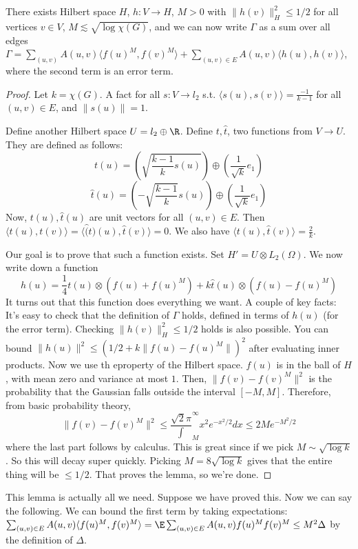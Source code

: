 \begin{lem} There exists Hilbert space $H$, $h: V \to H$, $M > 0$ with $\|h(v)\|_H^2 \leq 1/2$ for all vertices $v \in V$, $M \lesssim \sqrt{\log \chi(G)}$, and we can now write $\Gamma$ as a sum over all edges $\Gamma = \sum_{(u, v)} A(u, v) \langle f(u)^M, f(v)^M \rangle + \sum_{(u, v) \in E} A(u, v) \langle h(u), h(v) \rangle$, where the second term is an error term. 
\end{lem}
\begin{proof}
Let $k = \chi(G)$. A fact for all $s: V \to l_2$ s.t. $\langle s(u), s(v) \rangle = \frac{-1}{k - 1}$ for all $(u, v) \in E$, and $\|s(u)\| = 1$. 

Define another Hilbert space $U = l_2 \oplus \R$. Define $t, \hat{t}$, two functions from $V \to U$. They are defined as follows: 
\[
t(u) = (\sqrt{\frac{k - 1}{k} s(u)}) \oplus (\frac{1}{\sqrt{k}}e_1)
\]
\[
\hat{t}(u) = (-\sqrt{\frac{k - 1}{k}}s(u)) \oplus (\frac{1}{\sqrt{k}}e_1)
\]
Now, $t(u), \hat{t}(u)$ are unit vectors for all $(u, v) \in E$. Then $\langle t(u), t(v) \rangle = \langle \hat(t)(u), \hat{t}(v) \rangle = 0$. 
We also have $\langle t(u), \hat{t}(v) \rangle = \frac{2}{k}$. 

Our goal is to prove that such a function exists. Set $H' = U \otimes L_2(\Omega)$. We now write 
down a function 
\[
h(u) = \frac{1}{4}t(u) \otimes (f(u) + f(u)^M) + k\hat{t}(u) \otimes (f(u) - f(u)^M)
\]
It turns out that this function does everything we want. 
A couple of key facts: It's easy to check that the definition of $\Gamma$ holds, defined in terms of $h(u)$ (for the error term). Checking $\|h(v)\|_H^2 \leq 1/2$ holds is also possible. You can bound $\|h(u)\|^2 \leq (1/2 + k\|f(u) - f(u)^M\|)^2$ after evaluating inner products. Now we use th eproperty of the Hilbert space. $f(u)$ is in the ball of $H$, with mean zero and variance at most $1$. Then, $\|f(v) - f(v)^M\|^2$ is the probability that the Gaussian falls outside the interval $[-M, M]$. Therefore, from basic probability theory, 
\[
\|f(v) - f(v)^M\|^2 \leq \frac{\sqrt{2}{\pi}} \int_{M}^{\infty} x^2 e^{-x^2/2} dx \leq 2Me^{-M^2/2}
\]
where the last part follows by calculus. This is great since if we pick $M \sim \sqrt{\log k}$. So this will decay super quickly. Picking $M = 8\sqrt{\log k}$ gives that the entire thing will be $\leq 1/2$. That proves the lemma, so we're done.
\end{proof}

This lemma is actually all we need. Suppose we have proved this. Now we can say the following. We can bound the first term by taking expectations: 
$\sum_{(u, v) \in E} A(u, v)\langle f(u)^M, f(v)^M \rangle  = \E \sum_{(u, v) \in E} A(u, v)f(u)^Mf(v)^M \leq M^2 \Delta$ by the definition of $\Delta$. 

